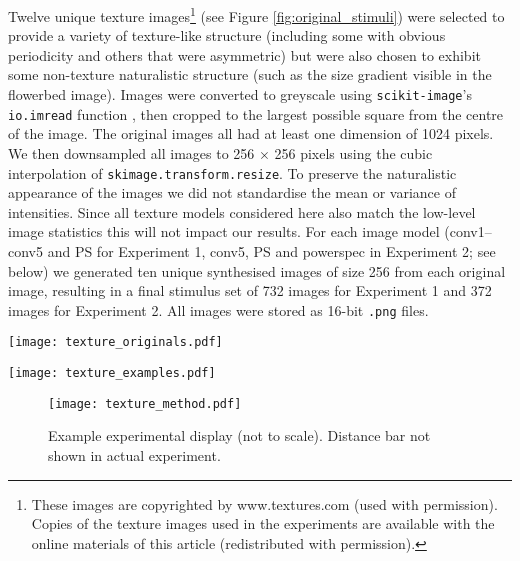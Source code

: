 \documentclass[doc, 11pt,a4paper,natbib]{apa6}\usepackage[]{graphicx}\usepackage[]{color}
\begin{document}
Twelve unique texture images\footnote{
These images are copyrighted by www.textures.com (used with permission).
Copies of the texture images used in the experiments are available with the online materials of this article (redistributed with permission).
}
(see Figure \ref{fig:original_stimuli}) were selected to provide a variety of texture-like structure (including some with obvious periodicity and others that were asymmetric) but were also chosen to exhibit some non-texture naturalistic structure (such as the size gradient visible in the flowerbed image).
Images were converted to greyscale using \texttt{scikit-image}'s \texttt{io.imread} function \citep{vanderwalt_scikitimage_2014}, then cropped to the largest possible square from the centre of the image. 
The original images all had at least one dimension of 1024 pixels.
We then downsampled all images to 256 $\times$ 256 pixels using the cubic interpolation of \texttt{skimage.transform.resize}.
To preserve the naturalistic appearance of the images we did not standardise the mean or variance of intensities.
Since all texture models considered here also match the low-level image statistics this will not impact our results.
For each image model (conv1--conv5 and PS for Experiment 1, conv5, PS and powerspec in Experiment 2; see below) we generated ten unique synthesised images of size 256 from each original image, resulting in a final stimulus set of 732 images for Experiment 1 and 372 images for Experiment 2.
All images were stored as 16-bit \texttt{.png} files.

\begin{figure*}
\centering
\texttt{[image: texture\_originals.pdf]}
\caption{
The twelve original texture images used in the experiments.
Arranged to correspond to Figure \ref{fig:expt-1-images}.
These images are copyrighted by www.textures.com (used with permission).
}
\label{fig:original_stimuli}
\end{figure*}


\begin{figure*}
\centering
\texttt{[image: texture\_examples.pdf]}
\caption{
Example experimental stimuli used in Experiment 1 (PS, conv1--conv5) and Experiment 2 (PS, conv5 and powerspec).
}
\label{fig:stimuli}
\end{figure*}


\begin{figure}
\centering
\texttt{[image: texture\_method.pdf]}
\caption{
Example experimental display (not to scale). Distance bar not shown in actual experiment.
}
\label{fig:methods}
\end{figure}
\end{document}
